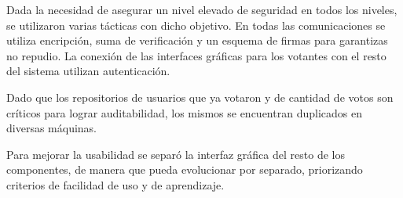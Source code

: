 
Dada la necesidad de asegurar un nivel elevado de seguridad en todos los niveles, se utilizaron varias tácticas con dicho objetivo. En todas las comunicaciones se utiliza encripción, suma de verificación y un esquema de firmas para garantizas no repudio. La conexión de las interfaces gráficas para los votantes con el resto del sistema utilizan autenticación.


Dado que los repositorios de usuarios que ya votaron y de cantidad de votos son críticos para lograr auditabilidad, los mismos se encuentran duplicados en diversas máquinas.

Para mejorar la usabilidad se separó la interfaz gráfica del resto de los componentes, de manera que pueda evolucionar por separado, priorizando criterios de facilidad de uso y de aprendizaje.


 
